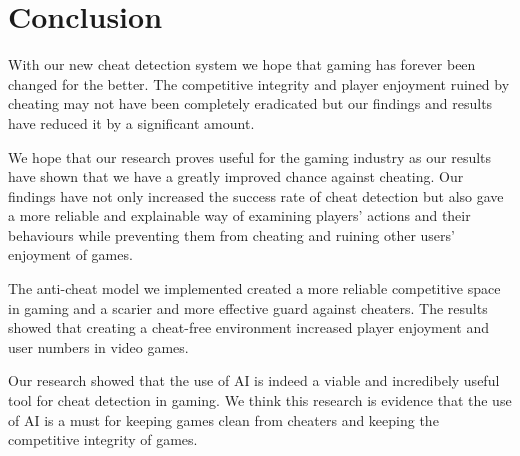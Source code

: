 \section{Conclusion}
\label{ch:conclusion}

With our new cheat detection system we hope that gaming has forever been changed for the better. The competitive integrity and player enjoyment ruined by cheating may not have been completely eradicated but our findings and results have reduced it by a significant amount. 

We hope that our research proves useful for the gaming industry as our results have shown that we have a greatly improved chance against cheating. Our findings have not only increased the success rate of cheat detection but also gave a more reliable and explainable way of examining players' actions and their behaviours while preventing them from cheating and ruining other users' enjoyment of games.

The anti-cheat model we implemented created a more reliable competitive space in gaming and a scarier and more effective guard against cheaters. The results showed that creating a cheat-free environment increased player enjoyment and user numbers in video games.

Our research showed that the use of AI is indeed a viable and incredibely useful tool for cheat detection in gaming. We think this research is evidence that the use of AI is a must for keeping games clean from cheaters and keeping the competitive integrity of games.

